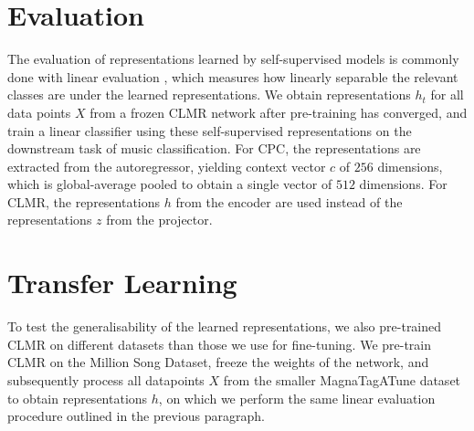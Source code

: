 \section{Evaluation}
\label{evaluation}
The evaluation of representations learned by self-supervised models is commonly done with linear evaluation \cite{oord_representation_2019,hjelm_learning_2019,chen_simple_2020}, which measures how linearly separable the relevant classes are under the learned representations.
We obtain representations $h_t$ for all data points $X$ from a frozen CLMR network after pre-training has converged, and train a linear classifier using these self-supervised representations on the downstream task of music classification.
For CPC, the representations are extracted from the autoregressor, yielding context vector $c$ of $256$ dimensions, which is global-average pooled to obtain a single vector of $512$ dimensions.
For CLMR, the representations $h$ from the encoder are used instead of the representations $z$ from the projector.


\section{Transfer Learning}
To test the generalisability of the learned representations, we also pre-trained CLMR on different datasets than those we use for fine-tuning.
We pre-train CLMR on the Million Song Dataset, freeze the weights of the network, and subsequently process all datapoints $X$ from the smaller MagnaTagATune dataset to obtain representations $h$, on which we perform the same linear evaluation procedure outlined in the previous paragraph.
